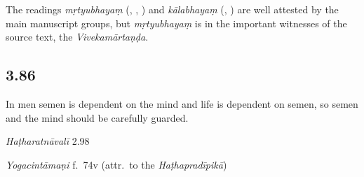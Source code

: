 \begin{ekdosis}
\begin{philcomm}[hp03_085]

The readings \emph{mṛtyubhayaṃ} (\alphaThree, \textbeta, \texteta) and \emph{kālabhayaṃ} (\alphaTwo, \textgamma) are well attested by the main manuscript groups, but \emph{mṛtyubhayaṃ} is in the important witnesses of the source text, the \emph{Vivekamārtaṇḍa}. %
\end{philcomm}

\subsection*{3.86}
\begin{translation}[hp03_086]
In men semen is dependent on the mind and life is dependent on semen, so semen and the mind should be carefully guarded.
\end{translation}


\begin{testimonia}[hp03_086]
\emph{Haṭharatnāvalī} 2.98
\begin{versinnote}
\end{versinnote}

\emph{Yogacintāmaṇi} f.~74v (attr.~to the \emph{Haṭhapradīpikā})
\begin{versinnote}
\end{versinnote}


\end{testimonia}
\end{ekdosis}
